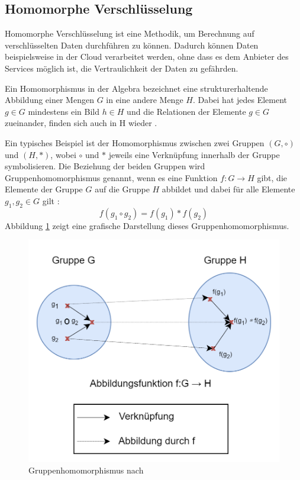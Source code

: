 \subsection{Homomorphe Verschlüsselung}\label{sec:homomorphe_verschlüsselung}

Homomorphe Verschlüsselung ist eine Methodik, um Berechnung auf verschlüsselten Daten durchführen zu können. Dadurch können Daten beispielsweise in der Cloud verarbeitet werden, ohne dass es dem Anbieter des Services möglich ist, die Vertraulichkeit der Daten zu gefährden.

Ein Homomorphismus in der Algebra bezeichnet eine strukturerhaltende Abbildung einer Mengen $G$ in eine andere Menge $H$.
Dabei hat jedes Element $g \in G $ mindestens ein Bild $h \in H$ und die Relationen der Elemente $g \in G$ zueinander, finden sich auch in H wieder \cite{B-2}.

Ein typisches Beispiel ist der Homomorphismus zwischen zwei Gruppen $(G,\circ)$ und $(H,\ast)$, wobei $\circ$ und $\ast$ jeweils eine Verknüpfung innerhalb der Gruppe symbolisieren. 
Die Beziehung der beiden Gruppen wird Gruppenhomomorphismus genannt, wenn es eine Funktion $f:G\to H$ gibt, die Elemente der Gruppe $G$ auf die Gruppe $H$ abbildet und dabei für alle Elemente $g_1,g_2 \in G$ gilt \cite{P-98}:
\begin{equation*}
    f(g_1 \circ g_2) = f(g_1) \ast f(g_2)
\end{equation*}
Abbildung \ref{fig:group_homomorphismus} zeigt eine grafische Darstellung dieses Gruppenhomomorphismus.

\begin{figure}[!htb]
    \centering
    \includegraphics[width=12.5cm]{figures/group_homomophismus.png}
    \caption{Gruppenhomomorphismus nach \cite{P-98}}
    \label{fig:group_homomorphismus}
\end{figure} 


